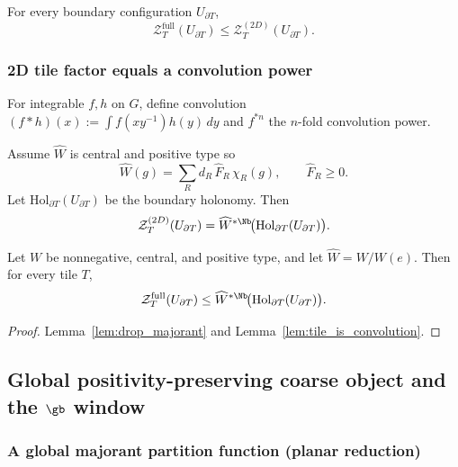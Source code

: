 \begin{lemma}\label{lem:drop_majorant}
For every boundary configuration $U_{\partial T}$,
\[
\mathcal Z_T^{\mathrm{full}}(U_{\partial T})\le \mathcal Z_T^{(2D)}(U_{\partial T}).
\]
\end{lemma}

\subsubsection{2D tile factor equals a convolution power}

For integrable $f,h$ on $G$, define convolution $(f*h)(x):=\int f(xy^{-1})h(y)\,dy$ and $f^{*n}$ the $n$-fold convolution power.

\begin{lemma}\label{lem:tile_is_convolution}
Assume $\widehat W$ is central and positive type so
\[
\widehat W(g)=\sum_R d_R\,\widehat F_R\,\chi_R(g),\qquad \widehat F_R\ge 0.
\]
Let $\mathrm{Hol}_{\partial T}(U_{\partial T})$ be the boundary holonomy.
Then
\[
\mathcal Z_T^{(2D)}(U_{\partial T})=\widehat W^{*\Nb}\!\bigl(\mathrm{Hol}_{\partial T}(U_{\partial T})\bigr).
\]
\end{lemma}

\begin{theorem}\label{thm:block_majorant_convolution}
Let $W$ be nonnegative, central, and positive type, and let $\widehat W=W/W(e)$.
Then for every tile $T$,
\[
\mathcal Z_T^{\mathrm{full}}(U_{\partial T})
\le
\widehat W^{*\Nb}\!\bigl(\mathrm{Hol}_{\partial T}(U_{\partial T})\bigr).
\]
\end{theorem}
\begin{proof}
Lemma~\ref{lem:drop_majorant} and Lemma~\ref{lem:tile_is_convolution}.
\end{proof}

\subsection{Global positivity-preserving coarse object and the \texorpdfstring{$\gb$}{g\_b} window}\label{sec:global}

\subsubsection{A global majorant partition function (planar reduction)}

